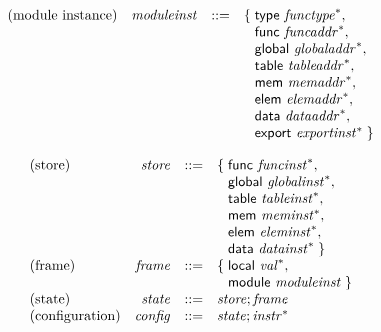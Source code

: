$$\begin{array}{@{}lrrl@{}l@{}}
\mbox{(module instance)} & {\mathit{moduleinst}} &::=& \{\; \begin{array}[t]{@{}l@{}l@{}}
\mathsf{type}~{{\mathit{functype}}^\ast},\; \\
  \mathsf{func}~{{\mathit{funcaddr}}^\ast},\; \\
  \mathsf{global}~{{\mathit{globaladdr}}^\ast},\; \\
  \mathsf{table}~{{\mathit{tableaddr}}^\ast},\; \\
  \mathsf{mem}~{{\mathit{memaddr}}^\ast},\; \\
  \mathsf{elem}~{{\mathit{elemaddr}}^\ast},\; \\
  \mathsf{data}~{{\mathit{dataaddr}}^\ast},\; \\
  \mathsf{export}~{{\mathit{exportinst}}^\ast} \;\}\end{array} \\
\end{array}
$$

\vspace{1ex}

$$
\begin{array}{@{}lrrl@{}l@{}}
\mbox{(store)} & {\mathit{store}} &::=& \{\; \begin{array}[t]{@{}l@{}l@{}}
\mathsf{func}~{{\mathit{funcinst}}^\ast},\; \\
  \mathsf{global}~{{\mathit{globalinst}}^\ast},\; \\
  \mathsf{table}~{{\mathit{tableinst}}^\ast},\; \\
  \mathsf{mem}~{{\mathit{meminst}}^\ast},\; \\
  \mathsf{elem}~{{\mathit{eleminst}}^\ast},\; \\
  \mathsf{data}~{{\mathit{datainst}}^\ast} \;\}\end{array} \\
\mbox{(frame)} & {\mathit{frame}} &::=& \{\; \begin{array}[t]{@{}l@{}l@{}}
\mathsf{local}~{{\mathit{val}}^\ast},\; \\
  \mathsf{module}~{\mathit{moduleinst}} \;\}\end{array} \\
\mbox{(state)} & {\mathit{state}} &::=& {\mathit{store}} ; {\mathit{frame}} \\
\mbox{(configuration)} & {\mathit{config}} &::=& {\mathit{state}} ; {{\mathit{instr}}^\ast} \\
\end{array}
$$

\vspace{1ex}

